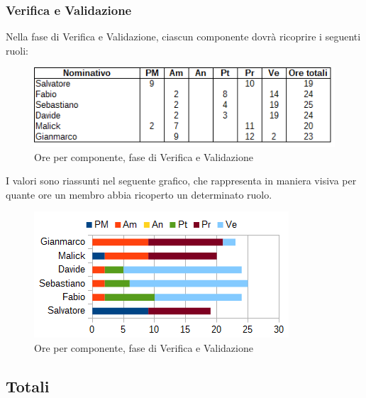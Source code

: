 		\subsubsection{Verifica e Validazione}
		Nella fase di Verifica e Validazione, ciascun componente dovrà ricoprire i seguenti ruoli: \\
		\begin{figure}[H]
			\centering
			\includegraphics[scale=0.75]{immagini/tabelle/validazione.png}
			\caption{Ore per componente, fase di Verifica e Validazione}
		\end{figure}
		I valori sono riassunti nel seguente grafico, che rappresenta in maniera visiva per quante ore un membro abbia ricoperto un determinato ruolo. \\
		\begin{figure}[H]
			\centering
			\includegraphics[scale=1]{immagini/grafici/validazione-barra.png}
			\caption{Ore per componente, fase di Verifica e Validazione}
		\end{figure}
	\subsection{Totali}
